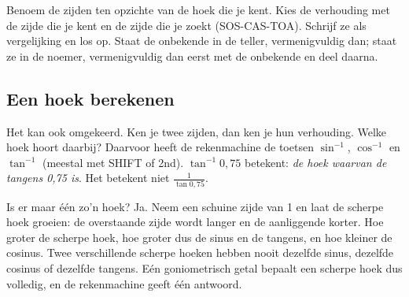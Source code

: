 \begin{werkwijze}
Benoem de zijden ten opzichte van de hoek die je kent. Kies de verhouding met de zijde die je kent en de zijde die je zoekt (SOS-CAS-TOA). Schrijf ze als vergelijking en los op. Staat de onbekende in de teller, vermenigvuldig dan; staat ze in de noemer, vermenigvuldig dan eerst met de onbekende en deel daarna.
\end{werkwijze}


\begin{oefeningen}
\end{oefeningen}

\subsection{Een hoek berekenen}

Het kan ook omgekeerd. Ken je twee zijden, dan ken je hun verhouding. Welke hoek hoort daarbij? Daarvoor heeft de rekenmachine de toetsen $\sin^{-1}$, $\cos^{-1}$ en $\tan^{-1}$ (meestal met \textsf{SHIFT} of \textsf{2nd}). $\tan^{-1} 0{,}75$ betekent: \textit{de hoek waarvan de tangens 0,75 is}. Het betekent niet $\tfrac{1}{\tan 0{,}75}$.

Is er maar één zo'n hoek? Ja. Neem een schuine zijde van 1 en laat de scherpe hoek groeien: de overstaande zijde wordt langer en de aanliggende korter. Hoe groter de scherpe hoek, hoe groter dus de sinus en de tangens, en hoe kleiner de cosinus. Twee verschillende scherpe hoeken hebben nooit dezelfde sinus, dezelfde cosinus of dezelfde tangens. Eén goniometrisch getal bepaalt een scherpe hoek dus volledig, en de rekenmachine geeft één antwoord.

